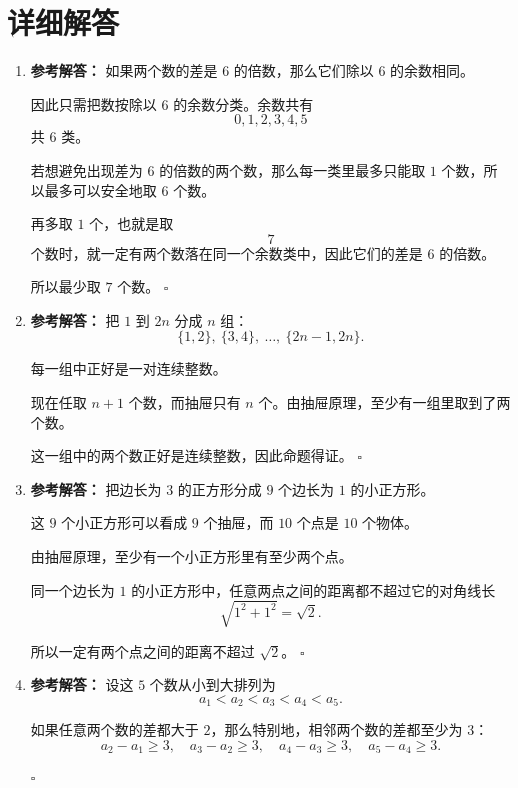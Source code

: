\documentclass[11pt,a4paper,fontset=fandol]{ctexart}
\newenvironment{solution}{\par\noindent\textbf{参考解答：}}{\hfill$\square$\par}
\begin{document}
\newpage
\section{详细解答}

\begin{enumerate}
  \item \begin{solution}
  如果两个数的差是 $6$ 的倍数，那么它们除以 $6$ 的余数相同。

  因此只需把数按除以 $6$ 的余数分类。余数共有
  \[
  0,1,2,3,4,5
  \]
  共 $6$ 类。

  若想避免出现差为 $6$ 的倍数的两个数，那么每一类里最多只能取 $1$ 个数，所以最多可以安全地取 $6$ 个数。

  再多取 $1$ 个，也就是取
  \[
  7
  \]
  个数时，就一定有两个数落在同一个余数类中，因此它们的差是 $6$ 的倍数。

  所以最少取 $7$ 个数。
  \end{solution}

  \item \begin{solution}
  把 $1$ 到 $2n$ 分成 $n$ 组：
  \[
  \{1,2\},\ \{3,4\},\ \ldots,\ \{2n-1,2n\}.
  \]

  每一组中正好是一对连续整数。

  现在任取 $n+1$ 个数，而抽屉只有 $n$ 个。由抽屉原理，至少有一组里取到了两个数。

  这一组中的两个数正好是连续整数，因此命题得证。
  \end{solution}

  \item \begin{solution}
  把边长为 $3$ 的正方形分成 $9$ 个边长为 $1$ 的小正方形。

  这 $9$ 个小正方形可以看成 $9$ 个抽屉，而 $10$ 个点是 $10$ 个物体。

  由抽屉原理，至少有一个小正方形里有至少两个点。

  同一个边长为 $1$ 的小正方形中，任意两点之间的距离都不超过它的对角线长
  \[
  \sqrt{1^2+1^2}=\sqrt{2}.
  \]

  所以一定有两个点之间的距离不超过 $\sqrt{2}$。
  \end{solution}

  \item \begin{solution}
  设这 $5$ 个数从小到大排列为
  \[
  a_1<a_2<a_3<a_4<a_5.
  \]

  如果任意两个数的差都大于 $2$，那么特别地，相邻两个数的差都至少为 $3$：
  \[
  a_2-a_1\ge 3,\quad a_3-a_2\ge 3,\quad a_4-a_3\ge 3,\quad a_5-a_4\ge 3.
  \]


\end{solution}
\end{enumerate}
\end{document}
